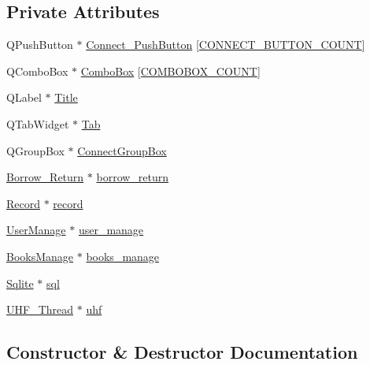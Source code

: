 \subsection*{Private Attributes}
\begin{DoxyCompactItemize}
\item 
Q\+Push\+Button $\ast$ \mbox{\hyperlink{class_widget_a61a0fc24c1e493f10809a38be1672b2f}{Connect\+\_\+\+Push\+Button}} \mbox{[}\mbox{\hyperlink{widget_8h_a8c7377d6ed6b5f2e3d196cda9bd66d91}{C\+O\+N\+N\+E\+C\+T\+\_\+\+B\+U\+T\+T\+O\+N\+\_\+\+C\+O\+U\+NT}}\mbox{]}
\item 
Q\+Combo\+Box $\ast$ \mbox{\hyperlink{class_widget_aa4932b7d383548bd1c3ef9fdc53b77b3}{Combo\+Box}} \mbox{[}\mbox{\hyperlink{widget_8h_a1d2dbe60aded23affb089e8fa1ea345f}{C\+O\+M\+B\+O\+B\+O\+X\+\_\+\+C\+O\+U\+NT}}\mbox{]}
\item 
Q\+Label $\ast$ \mbox{\hyperlink{class_widget_a4ee54afb0ebf24cd30a1a1471118abe4}{Title}}
\item 
Q\+Tab\+Widget $\ast$ \mbox{\hyperlink{class_widget_a27055a34cc856c2f2b8ddb704ac321fc}{Tab}}
\item 
Q\+Group\+Box $\ast$ \mbox{\hyperlink{class_widget_a51813d6ac9183c588f40b130d4e54cc9}{Connect\+Group\+Box}}
\item 
\mbox{\hyperlink{class_borrow___return}{Borrow\+\_\+\+Return}} $\ast$ \mbox{\hyperlink{class_widget_a53a21a665bf0bf478e56d2605dd48d90}{borrow\+\_\+return}}
\item 
\mbox{\hyperlink{class_record}{Record}} $\ast$ \mbox{\hyperlink{class_widget_add2a384a25f38b91a1e9cb30da7101b0}{record}}
\item 
\mbox{\hyperlink{class_user_manage}{User\+Manage}} $\ast$ \mbox{\hyperlink{class_widget_ab5466d1d1f1c9e475eb86b2644af7e4b}{user\+\_\+manage}}
\item 
\mbox{\hyperlink{class_books_manage}{Books\+Manage}} $\ast$ \mbox{\hyperlink{class_widget_a605a0b8528b41b051ff0b8ff4fee73ed}{books\+\_\+manage}}
\item 
\mbox{\hyperlink{class_sqlite}{Sqlite}} $\ast$ \mbox{\hyperlink{class_widget_acad204d397b66aa356c924b30b7965ec}{sql}}
\item 
\mbox{\hyperlink{class_u_h_f___thread}{U\+H\+F\+\_\+\+Thread}} $\ast$ \mbox{\hyperlink{class_widget_ae73de6c68cde3ec8fe6954c51407f57f}{uhf}}
\end{DoxyCompactItemize}


\subsection{Constructor \& Destructor Documentation}
\mbox{\label{class_widget_a29531c7f141e461322981b3b579d4590}} 
